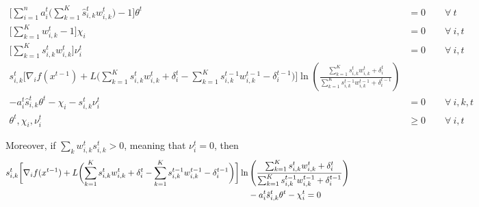 \begin{align*}
   \biggl[ \sum_{i=1}^{n} a_{i}^{t} \biggl( \sum_{k=1}^{K}  \hat{s}_{i,k}^{t} w_{i,k}^{t} \biggr) - 1 \biggr] \theta^{t} &= 0 \qquad \forall \ t \\
   \biggl[ \sum_{k=1}^{K}  w_{i,k}^{t}  - 1 \biggr] \chi_{i} &= 0 \qquad \forall\ i, t \\
   \biggl[ \sum_{k=1}^{K}  s_{i,k}^{t} w_{i,k}^{t} \biggr] \nu_{i}^{t} &= 0 \qquad \forall\ i, t \\
%
 s_{i,k}^{t} \biggl[  \nabla_{i} f(x^{t-1}) + L\biggl( \sum_{k=1}^{K} s_{i,k}^{t} w_{i,k}^{t} + \delta_{i}^{t} - \sum_{k=1}^{K} s_{i,k}^{t-1} w_{i,k}^{t-1} - \delta_{i}^{t-1} \biggr) \biggr] \ln \left( \frac{\sum_{k=1}^{K} s_{i,k}^{t} w_{i,k}^{t} + \delta_{i}^{t}}{\sum_{k=1}^{K}  s_{i,k}^{t-1}w_{i,k}^{t-1}  + \delta_{i}^{t-1}} \right) \\
        - a_{i}^{t} \hat{s}_{i,k}^{t} \theta^{t} - \chi_{i} - s_{i,k}^{t} \nu_{i}^{t} &= 0	\qquad \forall\ i,k,t \\
    \theta^{t}, \chi_{i}, \nu_{i}^{t} &\geq 0 \qquad \forall\ i, t
\end{align*}

Moreover, if $\sum_{k} w_{i,k}^{t} s_{i,k}^{t} > 0$, meaning that $\nu_{i}^{t} = 0$, then
\begin{align}	\label{eq:KKT2}
 s_{i,k}^{t} \biggl[  \nabla_{i} f(x^{t-1}) + L\biggl( \sum_{k=1}^{K} s_{i,k}^{t} w_{i,k}^{t} + \delta_{i}^{t} - \sum_{k=1}^{K} s_{i,k}^{t-1} w_{i,k}^{t-1} - \delta_{i}^{t-1} \biggr) \biggr] \ln & \left( \frac{\sum_{k=1}^{K} s_{i,k}^{t} w_{i,k}^{t} + \delta_{i}^{t}}{\sum_{k=1}^{K}  s_{i,k}^{t-1}w_{i,k}^{t-1}  + \delta_{i}^{t-1}} \right) \notag \\ 
        &- a_{i}^{t} \hat{s}_{i,k}^{t} \theta^{t} - \chi_{i}^{t} = 0
\end{align}


